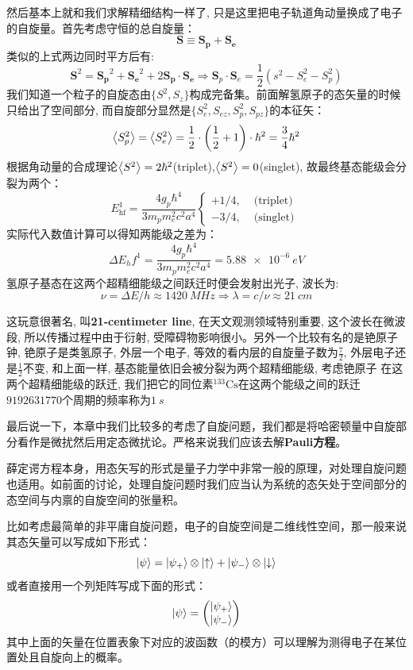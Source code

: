 \documentclass[a4paper,zihao=-4,linespread=1]{ctexrep}
\begin{document}
    然后基本上就和我们求解精细结构一样了, 只是这里把电子轨道角动量换成了电子的自旋量。首先考虑守恒的总自旋量：
    $$\mathbf{S}\equiv\mathbf{S_p}+\mathbf{S_e}$$
    类似的上式两边同时平方后有:
    \begin{equation}
        \mathbf{S}^2=\mathbf{S_p}^2+\mathbf{S_e}^2+2\mathbf{S_p}\cdot\mathbf{S_e}\Rightarrow\mathbf{S}_{p} \cdot \mathbf{S}_{e}=\frac{1}{2}\left(s^{2}-S_{e}^{2}-S_{p}^{2}\right)
    \end{equation}
    我们知道一个粒子的自旋态由$\{S^2,S_z\}$构成完备集。前面解氢原子的态矢量的时候只给出了空间部分, 而自旋部分显然是$\{S_e^2,S_{ez},S_p^2,S_{pz}\}$的本征矢：
    $$\Braket{S_p^2}=\Braket{S_e^2}=\frac{1}{2}\cdot\left(\frac{1}{2}+1\right)\cdot\hbar^2=\frac{3}{4}\hbar^2$$
    根据角动量的合成理论$\Braket{S^2}=2\hbar^2$(triplet),$\Braket{S^2}=0$(singlet), 故最终基态能级会分裂为两个：
    \begin{equation}
        E_{\mathrm{hf}}^{1}=\frac{4 g_{p} \hbar^{4}}{3 m_{p} m_{e}^{2} c^{2} a^{4}}\left\{\begin{array}{ll}
            +1 / 4, & \text { (triplet) } \\
            -3 / 4, & \text { (singlet) }
            \end{array}\right.
    \end{equation}
    实际代入数值计算可以得知两能级之差为：
    $$\Delta E_hf^1=\frac{4 g_{p} \hbar^{4}}{3 m_{p} m_{e}^{2} c^{2} a^{4}}=\SI{5.88e-6}{eV}$$
    氢原子基态在这两个超精细能级之间跃迁时便会发射出光子, 波长为:
    $$\nu=\Delta E/h\approx\SI{1420}{MHz}\Rightarrow \lambda=c/\nu\approx\SI{21}{cm}$$
    
    这玩意很著名, 叫\textbf{21-centimeter line}, 在天文观测领域特别重要, 这个波长在微波段, 所以传播过程中由于衍射, 受障碍物影响很小。另外一个比较有名的是铯原子钟, 
    铯原子是类氢原子, 外层一个电子, 等效的看内层的自旋量子数为$\frac{7}{2}$, 外层电子还是$\frac{1}{2}$不变, 和上面一样, 基态能量依旧会被分裂为两个超精细能级, 考虑铯原子
    在这两个超精细能级的跃迁, 我们把它的同位素$^{133} \mathrm{Cs}$在这两个能级之间的跃迁$9192631770$个周期的频率称为$\SI{1}{s}$

	最后说一下，本章中我们比较多的考虑了自旋问题，我们都是将哈密顿量中自旋部分看作是微扰然后用定态微扰论。严格来说我们应该去解\textbf{Pauli方程}。
	
	薛定谔方程本身，用态矢写的形式是量子力学中非常一般的原理，对处理自旋问题也适用。如前面的讨论，处理自旋问题时我们应当认为系统的态矢处于空间部分的态空间与内禀的自旋空间的张量积。
	
	比如考虑最简单的非平庸自旋问题，电子的自旋空间是二维线性空间，那一般来说其态矢量可以写成如下形式：
	\[\ket{\psi}=\ket{\psi_+}\otimes\ket{\uparrow}+\ket{\psi_-}\otimes\ket{\downarrow}\]
	或者直接用一个列矩阵写成下面的形式：
	\[\ket{\psi}=\begin{pmatrix}
		\ket{\psi_+}\\\ket{\psi_-}
	\end{pmatrix}\]
	其中上面的矢量在位置表象下对应的波函数（的模方）可以理解为测得电子在某位置处且自旋向上的概率。
		
\end{document}
